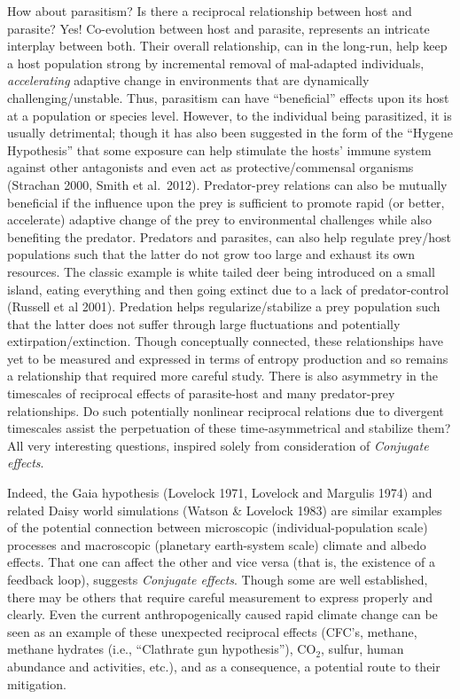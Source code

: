 \documentclass[11pt,letterpaper,]{paper}
\begin{document}
How about parasitism? Is there a reciprocal relationship between host
and parasite? Yes! Co-evolution between host and parasite, represents an
intricate interplay between both. Their overall relationship, can in the
long-run, help keep a host population strong by incremental removal of
mal-adapted individuals, \emph{accelerating} adaptive change in
environments that are dynamically challenging/unstable. Thus, parasitism
can have ``beneficial'' effects upon its host at a population or species
level. However, to the individual being parasitized, it is usually
detrimental; though it has also been suggested in the form of the
``Hygene Hypothesis'' that some exposure can help stimulate the hosts'
immune system against other antagonists and even act as
protective/commensal organisms (Strachan 2000, Smith et al.~2012).
Predator-prey relations can also be mutually beneficial if the influence
upon the prey is sufficient to promote rapid (or better, accelerate)
adaptive change of the prey to environmental challenges while also
benefiting the predator. Predators and parasites, can also help regulate
prey/host populations such that the latter do not grow too large and
exhaust its own resources. The classic example is white tailed deer
being introduced on a small island, eating everything and then going
extinct due to a lack of predator-control (Russell et al 2001).
Predation helps regularize/stabilize a prey population such that the
latter does not suffer through large fluctuations and potentially
extirpation/extinction. Though conceptually connected, these
relationships have yet to be measured and expressed in terms of entropy
production and so remains a relationship that required more careful
study. There is also asymmetry in the timescales of reciprocal effects
of parasite-host and many predator-prey relationships. Do such
potentially nonlinear reciprocal relations due to divergent timescales
assist the perpetuation of these time-asymmetrical and stabilize them?
All very interesting questions, inspired solely from consideration of
\emph{Conjugate effects}.

Indeed, the Gaia hypothesis (Lovelock 1971, Lovelock and Margulis 1974)
and related Daisy world simulations (Watson \& Lovelock 1983) are
similar examples of the potential connection between microscopic
(individual-population scale) processes and macroscopic (planetary
earth-system scale) climate and albedo effects. That one can affect the
other and vice versa (that is, the existence of a feedback loop),
suggests \emph{Conjugate effects}. Though some are well established,
there may be others that require careful measurement to express properly
and clearly. Even the current anthropogenically caused rapid climate
change can be seen as an example of these unexpected reciprocal effects
(CFC's, methane, methane hydrates (i.e., ``Clathrate gun hypothesis''),
CO\(_2\), sulfur, human abundance and activities, etc.), and as a
consequence, a potential route to their mitigation.
\end{document}
